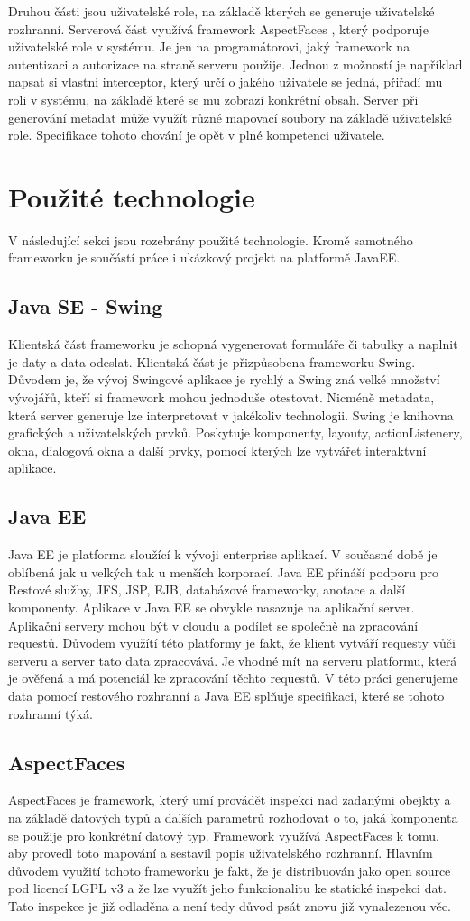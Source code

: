 Druhou části jsou uživatelské role, na základě kterých se generuje uživatelské rozhranní. Serverová část využívá framework AspectFaces \cite{aspectFaces}, který podporuje uživatelské role v systému. Je jen na programátorovi, jaký framework na autentizaci a autorizace na straně serveru použije. Jednou z možností je například napsat si vlastni interceptor, který určí o jakého uživatele se jedná, přiřadí mu roli v systému, na základě které se mu zobrazí konkrétní obsah. Server při generování metadat může využít různé mapovací soubory na základě uživatelské role. Specifikace tohoto chování je opět v plné kompetenci uživatele.
\section{Použité technologie}
V následující sekci jsou rozebrány použité technologie. Kromě samotného frameworku je součástí práce i ukázkový projekt na platformě JavaEE.
\subsection{Java SE - Swing}
Klientská část frameworku je schopná vygenerovat formuláře či tabulky a naplnit je daty a data odeslat. Klientská část je přizpůsobena frameworku Swing. Důvodem je, že vývoj Swingové aplikace je rychlý a Swing zná velké množství vývojářů, kteří si framework mohou jednoduše otestovat. Nicméně metadata, která server generuje lze interpretovat v jakékoliv technologii. Swing je knihovna grafických a uživatelských prvků. Poskytuje komponenty, layouty, actionListenery, okna, dialogová okna a další prvky, pomocí kterých lze vytvářet interaktvní aplikace.
\subsection{Java EE}
Java EE je platforma sloužící k vývoji enterprise aplikací. V současné době je oblíbená jak u velkých tak u menších korporací. Java EE přináší podporu pro Restové služby, JFS, JSP, EJB, databázové frameworky, anotace  a další komponenty. Aplikace v Java EE se obvykle nasazuje na aplikační server. Aplikační servery mohou být v cloudu a podílet se společně na zpracování requestů. Důvodem využítí této platformy je fakt, že klient vytváří requesty vůči serveru a server tato data zpracovává. Je vhodné mít na serveru platformu, která je ověřená a má potenciál ke zpracování těchto requestů. V této práci generujeme data pomocí restového rozhranní a Java EE splňuje specifikaci, které se tohoto rozhranní týká. 
\subsection{AspectFaces}
AspectFaces je framework, který umí provádět inspekci nad zadanými obejkty a na základě datových typů a dalších parametrů rozhodovat o to, jaká komponenta se použije pro konkrétní datový typ. Framework využívá AspectFaces k tomu, aby provedl toto mapování a sestavil popis uživatelského rozhranní. Hlavním důvodem využití tohoto frameworku je fakt, že je distribuován jako open source pod licencí LGPL v3 a že lze využít jeho funkcionalitu ke statické inspekci dat. Tato inspekce je již odladěna a není tedy důvod psát znovu již vynalezenou věc. 
